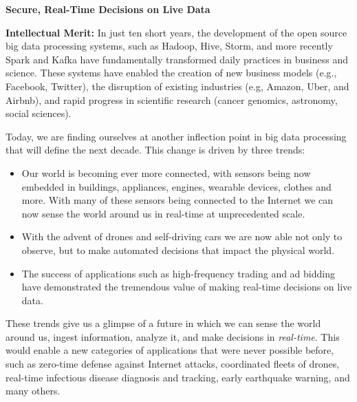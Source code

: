 \documentclass [10pt]{article}
\begin{document}
\pagestyle{empty}



\newpage


\begin{center}
{\Large {\bf Secure, Real-Time Decisions on Live Data}}
\end{center}

{%
{}
{\bf Intellectual Merit:}  In just ten short years, the development of the open source big data processing systems, such as Hadoop, Hive, Storm, and more recently Spark and Kafka have fundamentally transformed daily practices in business and science. These systems have enabled the creation of new business models (e.g., Facebook, Twitter), the disruption of existing industries (e.g, Amazon, Uber, and Airbnb), and rapid progress in scientific research (cancer genomics, astronomy, social sciences). 

Today, we are finding ourselves at another inflection point in big data processing that will define the next decade. This change is driven by three trends:

\begin{itemize}[noitemsep,topsep=0pt,parsep=0pt,partopsep=0pt]
\item Our world is becoming ever more connected, with sensors being now embedded in buildings, appliances, engines, wearable devices, clothes and more. With many of these sensors being connected to the Internet we can now sense the world around us in real-time at unprecedented scale.
\item With the advent of drones and self-driving cars we are now able not only to observe, but to make automated decisions that impact the physical world.
\item The success of applications such as high-frequency trading and ad bidding have demonstrated the tremendous value of making real-time decisions on live data.
\end{itemize}

These trends give us a glimpse of a future in which we can sense the world around us, ingest information, analyze it, and make decisions in \emph{real-time}.  
This would enable a new categories of applications that were never possible before, such as zero-time defense against Internet attacks, coordinated fleets of drones, real-time infectious disease diagnosis and tracking, early earthquake warning, and many others.

}
\end{document}

